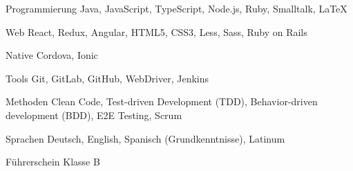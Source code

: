 

\begin{cvskills}

  \cvskill
    {Programmierung} %
    {Java, JavaScript, TypeScript, Node.js, Ruby, Smalltalk, \LaTeX} %

  \cvskill
    {Web} %
    {React, Redux, Angular, HTML5, CSS3, Less, Sass, Ruby on Rails} %

  \cvskill
    {Native} %
    {Cordova, Ionic} %

  \cvskill
    {Tools} %
    {Git, GitLab, GitHub, WebDriver, Jenkins} %

  \cvskill
    {Methoden} %
    {Clean Code, Test-driven Development (TDD), Behavior-driven development (BDD), E2E Testing, Scrum} %

  \cvskill
    {Sprachen} %
    {Deutsch, English, Spanisch (Grundkenntnisse), Latinum} %

  \cvskill
    {Führerschein} %
    {Klasse B} %

\end{cvskills}
